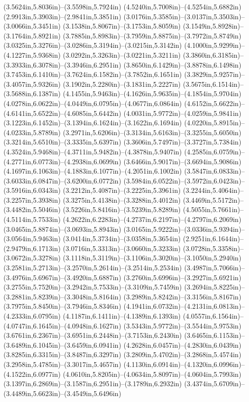 (3.5624in,5.8036in)--(3.5598in,5.7924in) (4.5240in,5.7008in)--(4.5254in,5.6882in) (2.9913in,5.3903in)--(2.9841in,5.3851in) (3.0176in,5.3585in)--(3.0137in,5.3503in)--(3.0066in,5.3451in) (3.1538in,5.8067in)--(3.1753in,5.8059in) (3.1549in,5.8928in)--(3.1764in,5.8921in) (3.7885in,5.8983in)--(3.7959in,5.8875in)--(3.7972in,5.8749in) (3.0325in,5.3276in)--(3.0286in,5.3194in)--(3.0215in,5.3142in) (4.1000in,5.9299in)--(4.1227in,5.9368in) (3.0292in,5.3263in)--(3.0221in,5.3211in) (3.3860in,6.3185in)--(3.3933in,6.3078in)--(3.3946in,6.2951in) (3.8650in,6.1429in)--(3.8878in,6.1498in) (3.7453in,6.1410in)--(3.7624in,6.1582in)--(3.7852in,6.1651in) (3.3829in,5.9257in)--(3.4057in,5.9326in) (3.1902in,5.2280in)--(3.1831in,5.2227in) (3.5675in,6.1514in)--(3.5688in,6.1387in) (4.1455in,5.9463in)--(4.1626in,5.9635in)--(4.1854in,5.9704in) (4.0278in,6.0622in)--(4.0449in,6.0795in)--(4.0677in,6.0864in) (4.6152in,5.6622in)--(4.6141in,5.6522in)--(4.6085in,5.6442in) (4.0031in,5.9772in)--(4.0259in,5.9841in) (3.1223in,6.1452in)--(3.1394in,6.1624in)--(3.1622in,6.1694in) (4.0220in,5.8915in)--(4.0233in,5.8789in) (3.2971in,5.6206in)--(3.3134in,5.6163in)--(3.3255in,5.6050in) (3.3214in,5.6510in)--(3.3335in,5.6397in) (3.3606in,5.7497in)--(3.3727in,5.7384in) (4.3524in,5.9468in)--(4.3711in,5.9482in)--(4.3878in,5.9407in) (4.2585in,6.0759in)--(4.2771in,6.0773in)--(4.2938in,6.0699in) (3.6466in,5.9017in)--(3.6694in,5.9086in) (4.1697in,6.1063in)--(4.1883in,6.1077in)--(4.2051in,6.1002in) (3.5847in,6.0833in)--(3.6033in,6.0847in)--(3.6200in,6.0772in) (3.5984in,6.0522in)--(3.5972in,6.0423in)--(3.5916in,6.0343in) (3.2212in,5.4087in)--(3.2225in,5.3961in) (3.2244in,5.4064in)--(3.2257in,5.3938in) (3.3275in,5.4138in)--(3.3288in,5.4012in) (3.4469in,5.5172in)--(3.4482in,5.5046in) (3.5226in,5.8416in)--(3.5239in,5.8289in) (4.5055in,5.7661in)--(4.5114in,5.7533in) (4.2622in,6.2283in)--(4.2737in,6.2197in)--(4.2797in,6.2069in) (3.0465in,5.8874in)--(3.0693in,5.8943in) (3.0165in,5.9222in)--(3.0336in,5.9394in)--(3.0564in,5.9463in) (3.0414in,5.3734in)--(3.0358in,5.3654in) (2.9251in,6.1644in)--(2.9479in,6.1713in) (3.0716in,5.3313in)--(3.0660in,5.3233in) (3.0728in,5.3358in)--(3.0672in,5.3278in) (3.1118in,5.3119in)--(3.1106in,5.3020in)--(3.1050in,5.2940in) (3.2581in,5.2713in)--(3.2570in,5.2614in)--(3.2514in,5.2534in) (3.4987in,5.7066in)--(3.4976in,5.6967in)--(3.4920in,5.6887in) (3.2760in,5.6996in)--(3.2927in,5.6921in) (3.2755in,5.7520in)--(3.2942in,5.7533in)--(3.3109in,5.7459in) (3.2694in,5.8225in)--(3.2881in,5.8239in)--(3.3048in,5.8164in) (3.2989in,5.8242in)--(3.3156in,5.8167in) (3.7975in,5.8450in)--(3.7946in,5.8346in) (4.1941in,6.0732in)--(4.2131in,6.0813in)--(4.2333in,6.0795in) (4.1187in,6.1411in)--(4.1389in,6.1393in) (4.0557in,6.1564in)--(4.0747in,6.1645in)--(4.0948in,6.1627in) (3.5343in,5.9772in)--(3.5544in,5.9753in) (3.6761in,6.2367in)--(3.6951in,6.2448in)--(3.7153in,6.2430in) (3.6465in,6.1153in)--(3.6489in,6.1045in)--(3.6459in,6.0941in) (4.2628in,6.0457in)--(4.2830in,6.0439in) (3.8285in,6.3315in)--(3.8487in,6.3297in) (3.2809in,5.4702in)--(3.2868in,5.4574in) (3.2958in,5.4785in)--(3.3017in,5.4657in) (4.1130in,6.0914in)--(4.1320in,6.0996in)--(4.1522in,6.0977in) (4.0610in,5.8205in)--(4.0634in,5.8097in)--(4.0604in,5.7993in) (3.1397in,6.2869in)--(3.1587in,6.2951in)--(3.1789in,6.2932in) (3.4374in,5.6709in)--(3.4489in,5.6623in)--(3.4549in,5.6496in) 